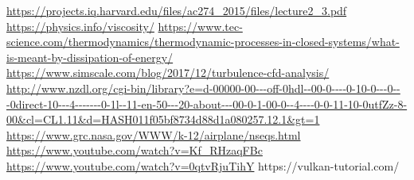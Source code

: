 \documentclass{article}
\begin{document}
\begin{thebibliography}{3}
\url{https://projects.iq.harvard.edu/files/ac274_2015/files/lecture2_3.pdf}
\url{https://physics.info/viscosity/}
\url{https://www.tec-science.com/thermodynamics/thermodynamic-processes-in-closed-systems/what-is-meant-by-dissipation-of-energy/}
\url{https://www.simscale.com/blog/2017/12/turbulence-cfd-analysis/}
\url{http://www.nzdl.org/cgi-bin/library?e=d-00000-00---off-0hdl--00-0----0-10-0---0---0direct-10---4-------0-1l--11-en-50---20-about---00-0-1-00-0--4----0-0-11-10-0utfZz-8-00\&cl=CL1.11\&d=HASH011f05bf8734d88d1a080257.12.1\&gt=1}
\url{https://www.grc.nasa.gov/WWW/k-12/airplane/nseqs.html}
\url{https://www.youtube.com/watch?v=Kf_RHzaqFBc}
\url{https://www.youtube.com/watch?v=0qtvRjuTihY}
https://vulkan-tutorial.com/
\end{thebibliography}
\end{document}
